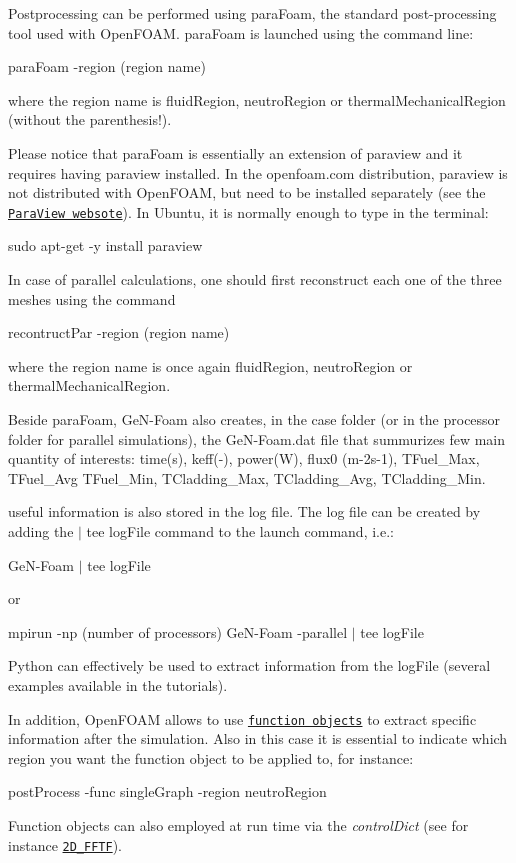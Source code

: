 Postprocessing can be performed using para\+Foam, the standard post-\/processing tool used with Open\+F\+O\+AM. para\+Foam is launched using the command line\+:

{\ttfamily para\+Foam -\/region (region name)}

where the region name is fluid\+Region, neutro\+Region or thermal\+Mechanical\+Region (without the parenthesis!).

Please notice that para\+Foam is essentially an extension of paraview and it requires having paraview installed. In the openfoam.\+com distribution, paraview is not distributed with Open\+F\+O\+AM, but need to be installed separately (see the \href{https://www.paraview.org/}{\tt Para\+View websote}). In Ubuntu, it is normally enough to type in the terminal\+:

{\ttfamily sudo apt-\/get -\/y install paraview}

In case of parallel calculations, one should first reconstruct each one of the three meshes using the command

{\ttfamily recontruct\+Par -\/region (region name)}

where the region name is once again fluid\+Region, neutro\+Region or thermal\+Mechanical\+Region.

Beside para\+Foam, Ge\+N-\/\+Foam also creates, in the case folder (or in the processor folder for parallel simulations), the Ge\+N-\/\+Foam.\+dat file that summurizes few main quantity of interests\+: time(s), keff(-\/), power(\+W), flux0 (m-\/2s-\/1), T\+Fuel\+\_\+\+Max, T\+Fuel\+\_\+\+Avg T\+Fuel\+\_\+\+Min, T\+Cladding\+\_\+\+Max, T\+Cladding\+\_\+\+Avg, T\+Cladding\+\_\+\+Min.

useful information is also stored in the log file. The log file can be created by adding the \textquotesingle{}$\vert$ tee log\+File\textquotesingle{} command to the launch command, i.\+e.\+:

{\ttfamily Ge\+N-\/\+Foam $\vert$ tee log\+File}

or

{\ttfamily mpirun -\/np (number of processors) Ge\+N-\/\+Foam -\/parallel $\vert$ tee log\+File}

Python can effectively be used to extract information from the log\+File (several examples available in the tutorials).

In addition, Open\+F\+O\+AM allows to use \href{https://www.openfoam.com/documentation/guides/latest/doc/guide-function-objects.html}{\tt function objects} to extract specific information after the simulation. Also in this case it is essential to indicate which region you want the function object to be applied to, for instance\+:

{\ttfamily post\+Process -\/func single\+Graph -\/region neutro\+Region}

Function objects can also employed at run time via the {\itshape control\+Dict} (see for instance \href{https://gitlab.com/foam-for-nuclear/GeN-Foam/-/blob/master/Tutorials/2D_FFTF/rootCase/system/controlDict}{\tt 2\+D\+\_\+\+F\+F\+TF}). 